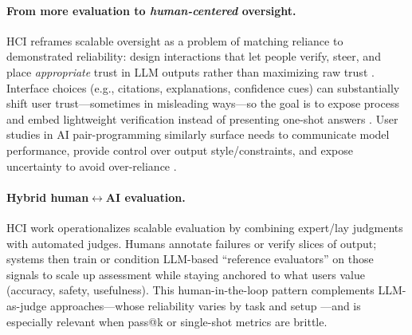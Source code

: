 \paragraph{From more evaluation to \emph{human-centered} oversight.}
HCI reframes scalable oversight as a problem of matching reliance to demonstrated reliability: design interactions that let people verify, steer, and place \emph{appropriate} trust in LLM outputs rather than maximizing raw trust \citep{bach2022trusthci}. Interface choices (e.g., citations, explanations, confidence cues) can substantially shift user trust---sometimes in misleading ways---so the goal is to expose process and embed lightweight verification instead of presenting one-shot answers \citep{ding2025citations}. User studies in AI pair-programming similarly surface needs to communicate model performance, provide control over output style/constraints, and expose uncertainty to avoid over-reliance \citep{wang2024trustcode}.%

\paragraph{Hybrid human$\leftrightarrow$AI evaluation.}
HCI work operationalizes scalable evaluation by combining expert/lay judgments with automated judges. Humans annotate failures or verify slices of output; systems then train or condition LLM-based ``reference evaluators'' on those signals to scale up assessment while staying anchored to what users value (accuracy, safety, usefulness). This human-in-the-loop pattern complements LLM-as-judge approaches---whose reliability varies by task and setup \citep{Kocmi2024HumanVsLLM,Li2024TrustLLMJudgments}---and is especially relevant when pass@k or single-shot metrics are brittle.%

